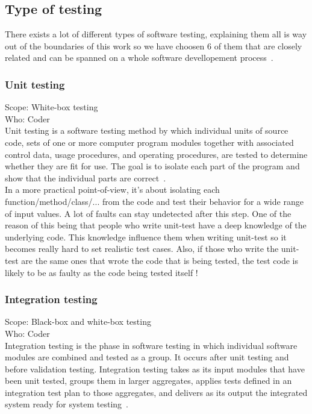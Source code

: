 \documentclass[12pt]{article}
\begin{document}
\subsection{Type of testing}

There exists a lot of different types of software testing, explaining them all is way out of the boundaries of this work so we have choosen 6 of them that are closely related and can be spanned on a whole software devellopement process~\cite{Laurie.W:Black-box}.

\subsubsection{Unit testing}

Scope: White-box testing\\
Who: Coder\\

Unit testing is a software testing method by which individual units of source code, sets of one or more computer program modules together with associated control data, usage procedures, and operating procedures, are tested to determine whether they are fit for use. The goal is to isolate each part of the program and show that the individual parts are correct~\cite{AutomatedDefectPrevention:2007}.\\

In a more practical point-of-view, it's about isolating each function/method/class/... from the code and test their behavior for a wide range of input values. A lot of faults can stay undetected after this step. One of the reason of this being that people who write unit-test have a deep knowledge of the underlying code. This knowledge influence them when writing unit-test so it becomes really hard to set realistic test cases. Also, if those who write the unit-test are the same ones that wrote the code that is being tested, the test code is likely to be as faulty as the code being tested itself !

\subsubsection{Integration testing}

Scope: Black-box and white-box testing\\
Who: Coder\\

Integration testing is the phase in software testing in which individual software modules are combined and tested as a group. It occurs after unit testing and before validation testing. Integration testing takes as its input modules that have been unit tested, groups them in larger aggregates, applies tests defined in an integration test plan to those aggregates, and delivers as its output the integrated system ready for system testing~\cite{TestingInSoftwareDevelopment:1987}.
\end{document}
